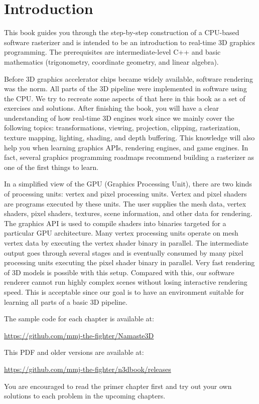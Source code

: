\chapter{Introduction}
This book guides you through the step-by-step construction of a CPU-based software rasterizer and is intended to be an introduction to real-time 3D graphics programming. The prerequisites are intermediate-level C++ and basic mathematics (trigonometry, coordinate geometry, and linear algebra).  

Before 3D graphics accelerator chips became widely available, software rendering was the norm. All parts of the 3D pipeline were implemented in software using the CPU. We try to recreate some aspects of that here in this book as a set of exercises and solutions. After finishing the book, you will have a clear understanding of how real-time 3D engines work since we mainly cover the following topics: transformations, viewing, projection, clipping, rasterization, texture mapping, lighting, shading, and depth buffering. This knowledge will also help you when learning graphics APIs, rendering engines, and game engines. In fact, several graphics programming roadmaps recommend building a rasterizer as one of the first things to learn.

In a simplified view of the GPU (Graphics Processing Unit), there are two kinds of processing units: vertex and pixel processing units. Vertex and pixel shaders are programs executed by these units. The user supplies the mesh data, vertex shaders, pixel shaders, textures, scene information, and other data for rendering. The graphics API is used to compile shaders into binaries targeted for a particular GPU architecture. Many vertex processing units operate on mesh vertex data by executing the vertex shader binary in parallel. The intermediate output goes through several stages and is eventually consumed by many pixel processing units executing the pixel shader binary in parallel. Very fast rendering of 3D models is possible with this setup. Compared with this, our software renderer cannot run highly complex scenes without losing interactive rendering speed. This is acceptable since our goal is to have an environment suitable for learning all parts of a basic 3D pipeline.

The sample code for each chapter is available at:

\url{https://github.com/mmj-the-fighter/Namaste3D}

This PDF and older versions are available at:

\url{https://github.com/mmj-the-fighter/n3dbook/releases}

You are encouraged to read the primer chapter first and try out your own solutions to each problem in the upcoming chapters.





\clearpage
